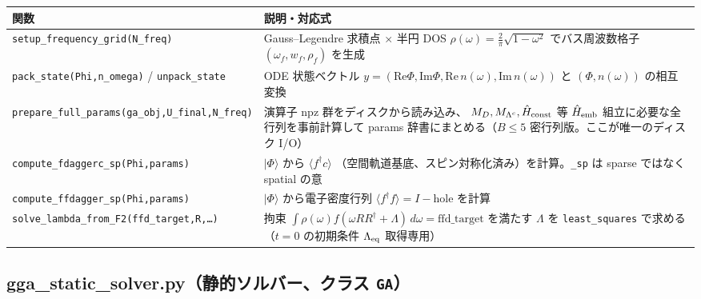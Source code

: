 \documentclass[11pt]{ltjsarticle}
\newcommand{\code}[1]{\texttt{#1}}
\begin{document}
\begin{longtable}{p{}p{}}
\toprule
関数 & 説明・対応式 \\
\midrule
\code{setup\_frequency\_grid(N\_freq)} & Gauss--Legendre 求積点 $\times$ 半円 DOS
$\rho(\omega)=\frac{2}{\pi}\sqrt{1-\omega^2}$ でバス周波数格子 $(\omega_f,w_f,\rho_f)$ を生成 \\
\code{pack\_state(Phi,n\_omega)} / \code{unpack\_state} & ODE 状態ベクトル
$y=(\mathrm{Re}\Phi,\mathrm{Im}\Phi,\mathrm{Re}\,n(\omega),\mathrm{Im}\,n(\omega))$ と
$(\Phi,n(\omega))$ の相互変換 \\
\code{prepare\_full\_params(ga\_obj,U\_final,N\_freq)} & 演算子 npz 群をディスクから読み込み、
$M_D,M_{\Lambda^c},\hat H_{\rm const}$ 等 $\hat H_{\rm emb}$ 組立に必要な全行列を事前計算して
params 辞書にまとめる（$B\le5$ 密行列版。ここが唯一のディスク I/O）\\
\code{compute\_fdaggerc\_sp(Phi,params)} & $|\Phi\rangle$ から $\langle f^\dagger c\rangle$
（空間軌道基底、スピン対称化済み）を計算。\code{\_sp} は sparse ではなく spatial の意 \\
\code{compute\_ffdagger\_sp(Phi,params)} & $|\Phi\rangle$ から電子密度行列
$\langle f^\dagger f\rangle=I-\text{hole}$ を計算 \\
\code{solve\_lambda\_from\_F2(ffd\_target,R,\ldots)} & 拘束
$\int\rho(\omega)f(\omega RR^\dagger+\Lambda)\,d\omega=\text{ffd\_target}$ を満たす $\Lambda$ を
\code{least\_squares} で求める（$t=0$ の初期条件 $\Lambda_{\rm eq}$ 取得専用）\\
\bottomrule
\end{longtable}

\subsection*{gga\_static\_solver.py（静的ソルバー、クラス \code{GA}）}
\end{document}
